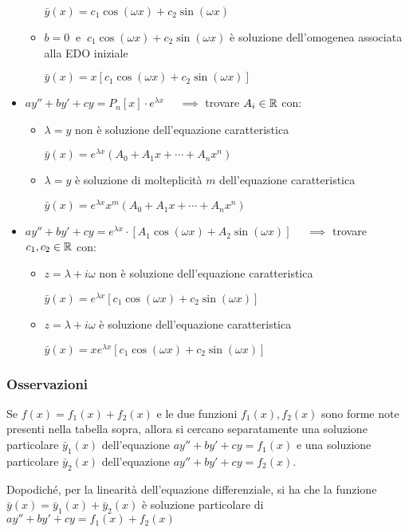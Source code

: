 \begin{itemize}
\begin{itemize}
                    \smallskip
                    \(\bar{y}(x) = c_{1}\cos(\omega x) + c_{2}\sin(\omega x)\)
                    \medskip
              \item \(b = 0\ \text{ e }\ c_{1}\cos(\omega x) + c_{2}\sin(\omega x)\) è soluzione dell'omogenea associata alla EDO iniziale

                    \smallskip
                    \(\bar{y}(x) = x[c_{1}\cos(\omega x) + c_{2}\sin(\omega x)]\)
                    \medskip
          \end{itemize}
    \item \(ay''+by'+cy = P_n[x] \cdot e^{\lambda x}\)
          \(\quad \implies \) trovare \(A_{i} \in \mathbb{R} \) con:
          \begin{itemize}
              \item \(\lambda = y\) non è soluzione dell'equazione caratteristica

                    \smallskip
                    \(\bar{y}(x) = e^{\lambda x} (A_0 + A_{1}x + \cdots + A_{n}x^{n})\)
                    \medskip
              \item \(\lambda = y\) è soluzione di molteplicità \(m\) dell'equazione caratteristica

                    \smallskip
                    \(\bar{y}(x) = e^{\lambda x} x^{m} (A_0 + A_{1}x + \cdots + A_{n}x^{n})\)
                    \medskip
          \end{itemize}
    \item \(ay''+by'+cy = e^{\lambda x} \cdot [A_{1}\cos(\omega x) + A_{2}\sin(\omega x)]\)
          \(\quad \implies \) trovare \(c_1,c_2 \in \mathbb{R} \) con:
          \begin{itemize}
              \item \(z = \lambda + i\omega \) non è soluzione dell'equazione caratteristica

                    \smallskip
                    \(\bar{y}(x) = e^{\lambda x} [c_{1}\cos(\omega x) + c_{2}\sin(\omega x)]\)
                    \medskip
              \item \(z = \lambda + i\omega \) è soluzione dell'equazione caratteristica

                    \smallskip
                    \(\bar{y}(x) = x e^{\lambda x} [c_{1}\cos(\omega x) + c_{2}\sin(\omega x)]\)
          \end{itemize}
\end{itemize}

\filbreak{}
\subsubsection*{Osservazioni}

Se \(f(x) = f_1(x) + f_2(x)\) e le due funzioni \(f_1(x),f_2(x)\) sono forme note presenti nella tabella sopra, allora si cercano separatamente una soluzione particolare \(\bar{y}_1(x)\) dell'equazione \(ay''+by'+cy=f_1(x)\) e una soluzione particolare \(\bar{y}_2(x)\) dell'equazione \(ay''+by'+cy=f_2(x)\).

Dopodiché, per la linearità dell'equazione differenziale, si ha che la funzione \(\bar{y}(x) = \bar{y}_1(x) + \bar{y}_2(x)\) è soluzione particolare di \(ay''+by'+cy=f_1(x) + f_2(x)\)
